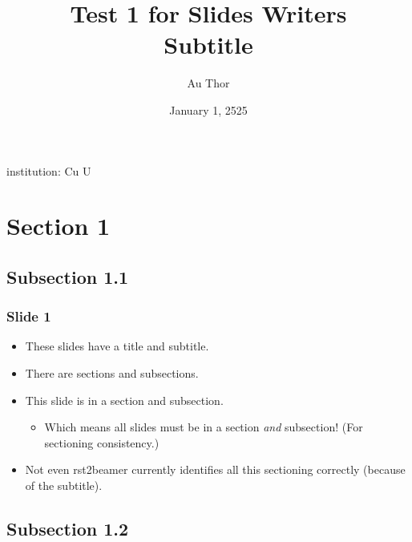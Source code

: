 \documentclass[t,english]{beamer}
\begin{document}
\title{Test 1 for Slides Writers%
  \label{test-1-for-slides-writers}%
  \\ %
  \large{Subtitle}%
  \label{subtitle}}
\author{Au Thor}
\date{January 1, 2525}
\maketitle
\item[{institution:}]
Cu U




\section*{Section 1}



\subsection*{Subsection 1.1}

\begin{frame}[fragile]
\frametitle{Slide 1}

\begin{itemize}[<+-| alert@+>]

\item These slides have a title and subtitle.

\item There are sections and subsections.

\item This slide is in a section and subsection.
\begin{itemize}[<+-| alert@+>]

\item Which means all slides must be in a section
\emph{and} subsection! (For sectioning consistency.)
\end{itemize}

\item Not even rst2beamer currently identifies all this
sectioning correctly (because of the subtitle).
\end{itemize}
\end{frame}



\subsection*{Subsection 1.2}
\end{document}
